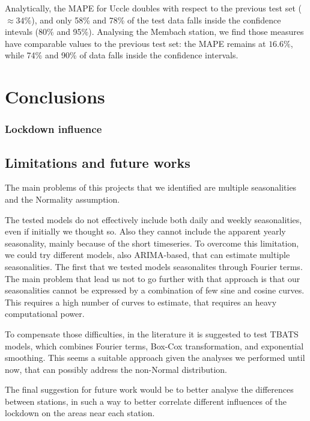 \documentclass[12pt]{article}
\begin{document}
Analytically, the MAPE for Uccle doubles with respect to the previous test set ($\approx34\%$), and only 58\% and 78\% of the test data falls inside the confidence intevals (80\% and 95\%). Analysing the Membach station, we find those measures have comparable values to the previous test set: the MAPE remains at $16.6\%$, while 74\% and 90\% of data falls inside the confidence intervals.






\section{Conclusions}
\subsubsection{Lockdown influence}
\subsection{Limitations and future works}
The main problems of this projects that we identified are multiple seasonalities and the Normality assumption.

The tested models do not effectively include both daily and weekly seasonalities, even if initially we thought so. Also they cannot include the apparent yearly seasonality, mainly because of the short timeseries.
To overcome this limitation, we could try different models, also ARIMA-based, that can estimate multiple seasonalities. The first that we tested models seasonalites through Fourier terms. The main problem that lead us not to go further with that approach is that our seasonalities cannot be expressed by a combination of few sine and cosine curves. This requires a high number of curves to estimate, that requires an heavy computational power.

To compensate those difficulties, in the literature it is suggested to test TBATS models, which combines Fourier terms, Box-Cox transformation, and exponential smoothing. This seems a suitable approach given the analyses we performed until now, that can possibly address the non-Normal distribution.

The final suggestion for future work would be to better analyse the differences between stations, in such a way to better correlate different influences of the lockdown on the areas near each station.




\newpage

\end{document}
